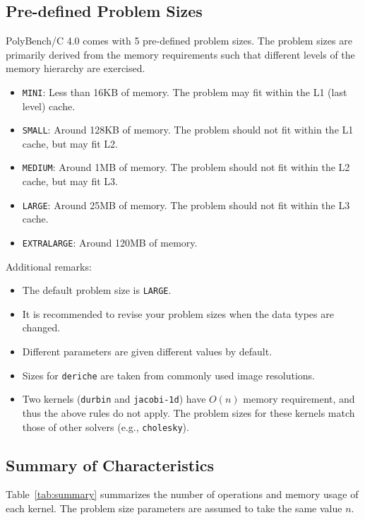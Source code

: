 \documentclass{article}
\begin{document}
\subsection*{Pre-defined Problem Sizes}
PolyBench/C 4.0 comes with 5 pre-defined problem sizes. The problem sizes are
primarily derived from the memory requirements such that different levels of
the memory hierarchy are exercised.

\begin{itemize}
\item {\tt MINI}: Less than 16KB of memory. The problem may fit within the L1 (last level) cache.
\item {\tt SMALL}: Around 128KB of memory. The problem should not fit within the L1 cache, but may fit L2.
\item {\tt MEDIUM}: Around 1MB of memory. The problem should not fit within the L2 cache, but may fit L3.
\item {\tt LARGE}: Around 25MB of memory. The problem should not fit within the L3 cache.
\item {\tt EXTRALARGE}: Around 120MB of memory. 
\end{itemize}

Additional remarks:
\begin{itemize}
\item The default problem size is {\tt LARGE}.
\item It is  recommended to revise your problem sizes when the data types are changed.
\item Different parameters are given different values by default.
\item Sizes for {\tt deriche} are taken from commonly used image resolutions.
\item Two kernels ({\tt durbin} and {\tt jacobi-1d}) have $O(n)$ memory requirement, and thus the above rules do not apply.
The problem sizes for these kernels match those of other solvers (e.g., {\tt cholesky}).
\end{itemize}

\subsection*{Summary of Characteristics}
Table~\ref{tab:summary} summarizes the number of operations and memory usage of each kernel.
The problem size parameters are assumed to take the same value $n$.
\end{document}
